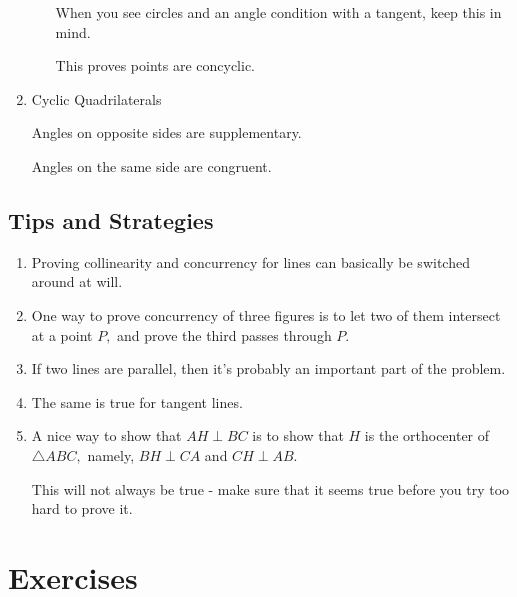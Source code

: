 \begin{enumerate}
    \begin{itemize}
    
    \Item When you see circles and an angle condition with a tangent, keep this in mind.
    
    \Item This proves points are concyclic.
    
    \end{itemize}
    
    \item Cyclic Quadrilaterals
    
    \begin{itemize}
    
    \Item Angles on opposite sides are supplementary.
    
    \Item Angles on the same side are congruent.
    
    \end{itemize}
\end{enumerate}

\subsection{Tips and Strategies}

\begin{enumerate}
    \item Proving collinearity and concurrency for lines can basically be switched around at will.
    
    \item One way to prove concurrency of three figures is to let two of them intersect at a point $P,$ and prove the third passes through $P.$
    
    \item If two lines are parallel, then it's probably an important part of the problem.
    
    \item The same is true for tangent lines.
    
    \item A nice way to show that $AH\perp BC$ is to show that $H$ is the orthocenter of $\triangle ABC,$ namely, $BH\perp CA$ and $CH\perp AB.$
    \begin{itemize}
    \Item This will not always be true - make sure that it seems true before you try too hard to prove it.
    \end{itemize}
\end{enumerate}

\pagebreak

\section{Exercises}

